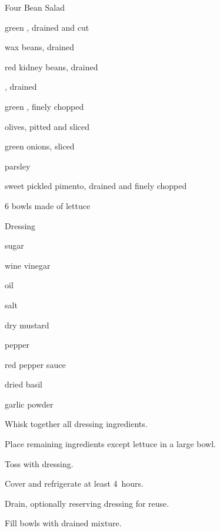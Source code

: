 \begin{recipe}{Four Bean Salad}{}{}

\begin{ingredients}
\item {} green , drained and cut
\item {} wax beans, drained
\item {} red kidney beans, drained
\item {} , drained
\item \C{\half} green , finely chopped
\item \C{\half} olives, pitted and sliced
\item \C{\quarter} green onions, sliced
\item \C{\quarter} parsley
\item \C{\quarter} sweet pickled pimento, drained and finely chopped
\item 6 bowls made of lettuce
\end{ingredients}

Dressing
\begin{ingredients}
\item \C{\half} sugar
\item \C{\half} wine vinegar
\item \C{\half} oil
\item \tp{1\half} salt
\item \tp{\half} dry mustard
\item \tp{\half} pepper
\item \tp{\half} red pepper sauce
\item \tp{\quarter} dried basil
\item \tp{\quarter} garlic powder
\end{ingredients}

\begin{directions}
\item Whisk together all dressing ingredients.
\item Place remaining ingredients except lettuce in a large bowl.
\item Toss with dressing.
\item Cover and refrigerate at least 4~hours.
\item Drain, optionally reserving dressing for reuse.
\item Fill bowls with drained mixture.
\end{directions}

\end{recipe}

